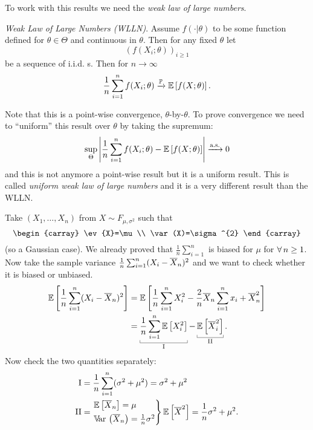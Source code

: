 \documentclass[12pt]{report}
\begin{document}
To work with this results we need the \emph{weak law of large numbers}.
\begin{theorem}
	\emph{Weak Law of Large Numbers (WLLN)}. Assume $f(\cdot|\theta)$ to be some function defined for $\theta\in\Theta$ and continuous in $\theta$. Then for any fixed $\theta$ let
	\begin{equation*}
		{\left(f(X_{i};\theta)\right)}_{i\geq1}
	\end{equation*}
	be a sequence of i.i.d. \rv s. Then for $n\to\infty$
	\begin{equation*}
		\frac{1}{n}\sum_{i=1}^{n}f(X_{i};\theta)\xrightarrow[]{\mathbb{P}}\mathbb{E}\left[f(X;\theta)\right].
	\end{equation*}
\end{theorem}
Note that this is a point-wise convergence, $\theta$-by-$\theta$. To prove convergence we need to ``uniform'' this result over $\theta$ by taking the supremum:
\begin{equation*}
	\sup_{\Theta}\left|\frac{1}{n}\sum_{i=1}^{n}f(X_{i};
	\theta)-\mathbb{E}\left[f(X;\theta)\right]\right|\xrightarrow[]{\text{a.s.}}0
\end{equation*}
and this is not anymore a point-wise result but it is a uniform result. This is called \emph{uniform weak law of large numbers} and it is a very different result than the WLLN. \par
Take $(X_{1},\ldots,X_{n})$ from $X\sim F_{\mu,\sigma^{2}}$ such that
\begin{equation*}
	\begin{carray}
		\ev{X}=\mu\\
		\var(X)=\sigma^{2}
	\end{carray}
\end{equation*}
(so a Gaussian case). We already proved that $\frac{1}{n}\sum_{i=1}^{n}$ is biased for $\mu$ for $\forall\, n\geq 1$. Now take the sample variance $\frac{1}{n}\sum_{i=1}^{n}(X_{i}-\overline{X}_{n})^{2}$ and we want to check whether it is biased or unbiased.
\begin{align*}
	\ev{\frac{1}{n}\sum_{i=1}^{n}(X_{i}-\Xbar_{n})^{2}}&=\ev{\frac{1}{n}\sum_{i=1}^{n}X_{i}^{2}-\frac{2}{n}\Xbar_{n}\sum_{i=1}^{n}x_{i}+\Xbar^{2}_{n}}\\
 	&=\ubracketthin{\frac{1}{n}\sum_{i=1}^{n}\ev{X^{2}_{i}}}_{\mathrm{I}}-\ubracketthin{\ev{\Xbar^{2}_{i}}}_{\mathrm{II}}.
\end{align*}
Now check the two quantities separately:
\begin{align*}
	\mathrm{I}&=\frac{1}{n}\sum_{i=1}^{n}(\sigma^{2}+\mu^{2})=\sigma^{2}+\mu^{2}\\
	\mathrm{II}&=\begin{rcases}
		\mathbb{E}\left[\overline{X}_{n}\right]=\mu\\
		\mathbb{V}\!\mathrm{ar}\,\left(\overline{X}_{n}\right)=\frac{1}{n}\sigma^{2}
	\end{rcases}\mathbb{E}\left[\overline{X}^{2}\right]=\frac{1}{n}\sigma^{2}+\mu^{2}.
\end{align*}
\end{document}
